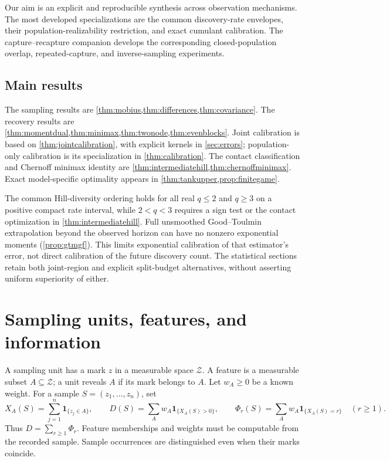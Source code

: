 \documentclass[11pt]{article}
\numberwithin{equation}{section}
\theoremstyle{definition}
\theoremstyle{remark}
\newcommand{\ind}{\mathbf1}
\begin{document}
Our aim is an explicit and reproducible synthesis across observation mechanisms.
The most developed specializations are the common discovery-rate envelopes,
their population-realizability restriction, and exact cumulant calibration.
The capture--recapture companion \cite{LongCapture} develops the corresponding
closed-population overlap, repeated-capture, and inverse-sampling experiments.

\subsection{Main results}
The sampling results are \cref{thm:mobius,thm:differences,thm:covariance}. The recovery results are \cref{thm:momentdual,thm:minimax,thm:twonode,thm:evenblocks}. Joint calibration is based on \cref{thm:jointcalibration}, with explicit kernels in \cref{sec:errors}; population-only calibration is its specialization in \cref{thm:calibration}. The contact classification and Chernoff minimax identity are \cref{thm:intermediatehill,thm:chernoffminimax}. Exact model-specific optimality appears in \cref{thm:tankupper,prop:finitegame}.

The common Hill-diversity ordering holds for all real $q\le2$ and $q\ge3$ on a positive compact rate interval, while $2<q<3$ requires a sign test or the contact optimization in \cref{thm:intermediatehill}. Full unsmoothed Good--Toulmin extrapolation beyond the observed horizon can have no nonzero exponential moments (\cref{prop:gtmgf}). This limits exponential calibration of that estimator's error, not direct calibration of the future discovery count. The statistical sections retain both joint-region and explicit split-budget alternatives, without asserting uniform superiority of either.

\section{Sampling units, features, and information}\label{sec:model}
A sampling unit has a mark $z$ in a measurable space $\mathcal Z$. A feature is a measurable subset $A\subseteq\mathcal Z$; a unit reveals $A$ if its mark belongs to $A$. Let $w_A\ge0$ be a known weight. For a sample $S=(z_1,\ldots,z_n)$, set
\begin{equation}\label{eq:features}
 X_A(S)=\sum_{j=1}^n\ind_{\{z_j\in A\}},\qquad
 D(S)=\sum_Aw_A\ind_{\{X_A(S)>0\}},\qquad
 \Phi_r(S)=\sum_Aw_A\ind_{\{X_A(S)=r\}}\quad(r\ge1).
\end{equation}
Thus $D=\sum_{r\ge1}\Phi_r$. Feature memberships and weights must be computable from the recorded sample. Sample occurrences are distinguished even when their marks coincide.
\end{document}
